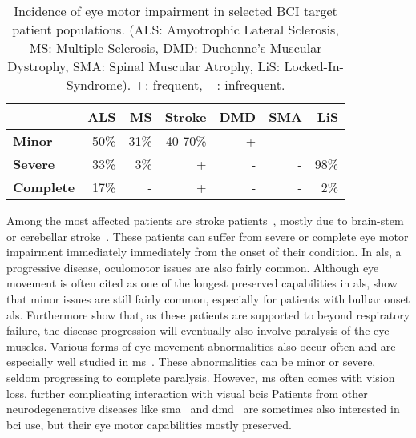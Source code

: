 \begin{table}[h]
  \sffamily
  \footnotesize
	\centering
	\begin{tabular}{@{}l|rrrrr|r@{}}
              & \bfseries ALS  & \bfseries MS   & \bfseries Stroke  &\bfseries DMD &\bfseries SMA  &\bfseries LiS  \\ \hline
		\bfseries Minor    & 50\% & 31\% & 40-70\% & + & - &      \\
		\bfseries Severe   & 33\% & 3\%  & +       & - & - & 98\% \\
		\bfseries Complete & 17\% & -    & +       & - & - & 2\%  \\
	\end{tabular}
	\caption{Incidence of eye motor impairment in selected BCI target
		patient populations. (ALS: Amyotrophic Lateral Sclerosis, MS: Multiple Sclerosis,
		DMD: Duchenne's Muscular Dystrophy, SMA: Spinal Muscular Atrophy, LiS:
		Locked-In-Syndrome). $+$: frequent, $-$: infrequent.}\label{tab:incidence}
\end{table}

Among the most affected patients are stroke patients~\cite{Pollock2011}, mostly
due to brain-stem or cerebellar stroke~\cite{Moncayo2009,Bogousslavsky1987}.
These patients can suffer from severe or complete eye motor impairment immediately
immediately from the onset of their condition.
In \ac{als}, a progressive disease, oculomotor issues are also fairly common.
Although eye movement is often cited as one of the longest preserved
capabilities in \ac{als}, \textcite{Guo2022} show that minor issues are still
fairly common,
especially for patients with bulbar onset \ac{als}.
Furthermore \textcite{Hayashi1991} show that, as these patients are supported to beyond
respiratory failure, the disease progression will eventually also involve
paralysis of the eye muscles.
Various forms of eye movement abnormalities also occur often and are especially well studied in
\ac{ms}~\cite{Mueri1985,Prasad2010,Castelnovo2016,Serra2018,Polet2020}.
These abnormalities can be minor or severe, seldom progressing to complete
paralysis.
However, \ac{ms} often comes with vision loss, further complicating interaction
with visual \acp{bci}
Patients from other neurodegenerative diseases like
\ac{sma}~\cite{Anagnostou2021} and \ac{dmd}~\cite{Lui2001} are
sometimes also interested in \ac{bci} use, but their eye motor capabilities
mostly preserved.

